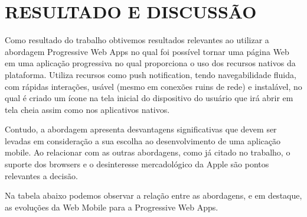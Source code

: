 \section{\esp RESULTADO E DISCUSSÃO}
Como resultado do trabalho obtivemos resultados relevantes ao utilizar a abordagem Progressive Web Apps no qual foi possível tornar uma página Web em uma aplicação progressiva no qual proporciona o uso dos recursos nativos da plataforma. Utiliza recursos como push notification, tendo navegabilidade fluida, com rápidas interações, usável (mesmo em conexões ruins de rede) e instalável, no qual é criado um ícone na tela inicial do dispositivo do usuário que irá abrir em tela cheia assim como nos aplicativos nativos.

Contudo, a abordagem apresenta desvantagens significativas que devem ser levadas em consideração a sua escolha ao desenvolvimento de uma aplicação mobile. Ao relacionar com as outras abordagens, como já citado  no trabalho, o suporte dos browsers e o desinteresse mercadológico da Apple são pontos relevantes a decisão.

Na tabela abaixo podemos observar a relação entre as abordagens, e em destaque, as evoluções da Web  Mobile para a Progressive Web Apps.


